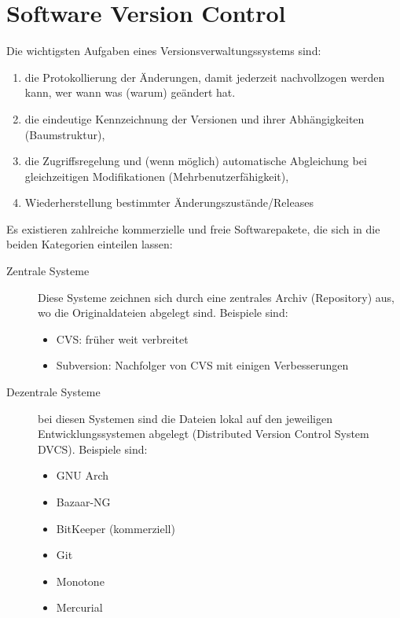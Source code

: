 
\chapter{Software Version Control}
Die wichtigsten Aufgaben eines Versionsverwaltungssystems
sind:
\begin{enumerate}
\item
 die Protokollierung der Änderungen, damit jederzeit nachvollzogen
                 werden kann, wer wann was (warum) geändert hat.
\item die eindeutige Kennzeichnung der Versionen und ihrer
  Abhängigkeiten (Baumstruktur),
\item die Zugriffsregelung und (wenn möglich) automatische Abgleichung
  bei gleichzeitigen Modifikationen (Mehrbenutzerfähigkeit),
\item Wiederherstellung bestimmter Änderungszustände/Releases
\end{enumerate}
\ifslides
\newpage
\fi
Es existieren zahlreiche kommerzielle und freie Softwarepakete, die sich in
die beiden Kategorien einteilen lassen:
\begin{description}
\item[Zentrale Systeme] Diese Systeme zeichnen sich durch eine zentrales
  Archiv (Repository) aus, wo die Originaldateien abgelegt sind. Beispiele sind:
  \begin{itemize}
  \item CVS: früher weit verbreitet
  \item Subversion: Nachfolger von CVS mit einigen Verbesserungen
  \end{itemize}
\item[Dezentrale Systeme] bei diesen Systemen sind die Dateien lokal auf den
  jeweiligen Entwicklungssystemen abgelegt (Distributed Version
  Control System DVCS). Beispiele sind:
  \begin{itemize}
  \item GNU Arch
  \item Bazaar-NG
  \item BitKeeper (kommerziell)
  \item Git
  \item Monotone
  \item Mercurial
  \end{itemize}
\end{description}
